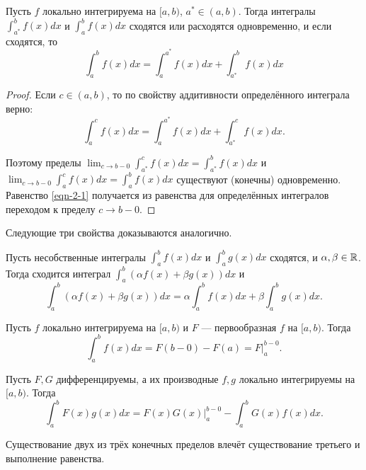 \begin{property}
    Пусть $f$ локально интегрируема на $[a, b)$, $a^* \in (a, b)$. Тогда интегралы $\int_{a^*}^b f(x) dx$ и $\int_a^b f(x) dx$ сходятся или расходятся одновременно, и если сходятся, то
    \label{eqn-2-1}
    \begin{equation}
        \int_a^b f(x) dx = \int_a^{a^*} f(x) dx + \int_{a^*}^b f(x) dx
    \end{equation}

    \begin{proof}
        Если $c \in (a, b)$, то по свойству аддитивности определённого интеграла верно:
        \[
            \int_a^c f(x) dx = \int_a^{a^*} f(x) dx + \int_{a^*}^c f(x) dx.
        \]

        Поэтому пределы $\lim_{c \rightarrow b - 0} \int_{a^*}^{c} f(x) dx = \int_{a^*}^b f(x) dx$ и $\lim_{c \rightarrow b - 0} \int_a^c f(x) dx = \int_a^b f(x) dx$ существуют (конечны) одновременно. Равенство \ref{eqn-2-1} получается из равенства для определённых интегралов переходом к пределу $c \rightarrow b - 0$.
    \end{proof}
\end{property}

Следующие три свойства доказываются аналогично.

\begin{property}[линейность] 
    Пусть несобственные интегралы $\int_a^b f(x) dx$ и $\int_a^b g(x) dx$ сходятся, и $\alpha, \beta \in \mathbb{R}$. Тогда сходится интеграл $\int_a^b \left(\alpha f(x) + \beta g(x)\right) dx$ и
    \[
        \int_a^b \left(\alpha f(x) + \beta g(x)\right) dx = \alpha \int_a^b f(x) dx + \beta \int_a^b g(x) dx.
    \]
\end{property}

\begin{property}
    Пусть $f$ локально интегрируема на $[a, b)$ и $F$ --- первообразная $f$ на $[a, b)$. Тогда
    \[
        \int_a^b f(x) dx = F(b - 0) - F(a) = F \vert_a^{b - 0}.
    \]
\end{property}

\begin{property}
    Пусть $F, G$ дифференцируемы, а их производные $f, g$ локально интегрируемы на $[a, b)$. Тогда
    \[
        \int^b_a F(x) g(x) dx = F(x)G(x)\vert^{b - 0}_a - \int_a^b G(x) f(x) dx.
    \]

    Существование двух из трёх конечных пределов влечёт существование третьего и выполнение равенства.
\end{property}

